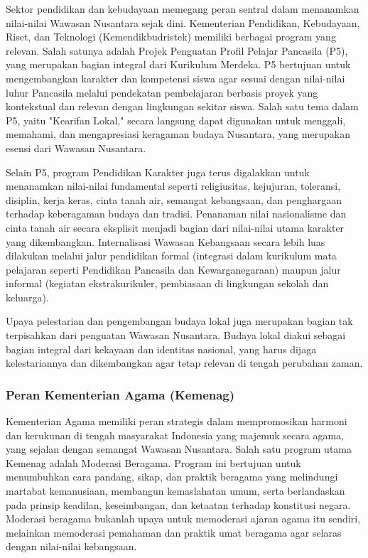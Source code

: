 \documentclass[12pt, a4paper]{article}
\begin{document}
Sektor pendidikan dan kebudayaan memegang peran sentral dalam menanamkan nilai-nilai Wawasan Nusantara sejak dini. Kementerian Pendidikan, Kebudayaan, Riset, dan Teknologi (Kemendikbudristek) memiliki berbagai program yang relevan. Salah satunya adalah Projek Penguatan Profil Pelajar Pancasila (P5), yang merupakan bagian integral dari Kurikulum Merdeka. P5 bertujuan untuk mengembangkan karakter dan kompetensi siswa agar sesuai dengan nilai-nilai luhur Pancasila melalui pendekatan pembelajaran berbasis proyek yang kontekstual dan relevan dengan lingkungan sekitar siswa. Salah satu tema dalam P5, yaitu "Kearifan Lokal," secara langsung dapat digunakan untuk menggali, memahami, dan mengapresiasi keragaman budaya Nusantara, yang merupakan esensi dari Wawasan Nusantara.  

Selain P5, program Pendidikan Karakter juga terus digalakkan untuk menanamkan nilai-nilai fundamental seperti religiusitas, kejujuran, toleransi, disiplin, kerja keras, cinta tanah air, semangat kebangsaan, dan penghargaan terhadap keberagaman budaya dan tradisi. Penanaman nilai nasionalisme dan cinta tanah air secara eksplisit menjadi bagian dari nilai-nilai utama karakter yang dikembangkan. Internalisasi Wawasan Kebangsaan secara lebih luas dilakukan melalui jalur pendidikan formal (integrasi dalam kurikulum mata pelajaran seperti Pendidikan Pancasila dan Kewarganegaraan) maupun jalur informal (kegiatan ekstrakurikuler, pembiasaan di lingkungan sekolah dan keluarga).  

Upaya pelestarian dan pengembangan budaya lokal juga merupakan bagian tak terpisahkan dari penguatan Wawasan Nusantara. Budaya lokal diakui sebagai bagian integral dari kekayaan dan identitas nasional, yang harus dijaga kelestariannya dan dikembangkan agar tetap relevan di tengah perubahan zaman.  

\subsubsection*{Peran Kementerian Agama (Kemenag)}

Kementerian Agama memiliki peran strategis dalam mempromosikan harmoni dan kerukunan di tengah masyarakat Indonesia yang majemuk secara agama, yang sejalan dengan semangat Wawasan Nusantara. Salah satu program utama Kemenag adalah Moderasi Beragama. Program ini bertujuan untuk menumbuhkan cara pandang, sikap, dan praktik beragama yang melindungi martabat kemanusiaan, membangun kemaslahatan umum, serta berlandaskan pada prinsip keadilan, keseimbangan, dan ketaatan terhadap konstitusi negara. Moderasi beragama bukanlah upaya untuk memoderasi ajaran agama itu sendiri, melainkan memoderasi pemahaman dan praktik umat beragama agar selaras dengan nilai-nilai kebangsaan.  
\end{document}
